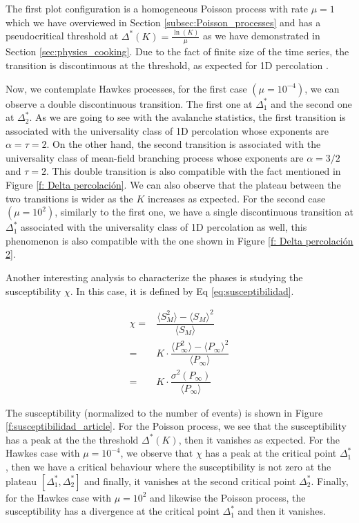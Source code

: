 The first plot configuration is a homogeneous Poisson process with rate $\mu=1$ which we have overviewed in Section \ref{subsec:Poisson_processes} and has a pseudocritical threshold at 
$\Delta^*(K)=\frac{\ln(K)}{\mu}$ as we have demonstrated in Section \ref{sec:physics_cooking}. Due to the fact of finite size of the time series, the transition is discontinuous at 
the threshold, as expected for 1D percolation \cite{stauffer2018introduction}.

Now, we contemplate Hawkes processes, for the first case $\left( \mu=10^{-4} \right)$, we can observe a double discontinuous transition. The first one at $\Delta_1^*$ and the second one at
$\Delta_2^*$. As we are going to see with the avalanche statistics, the first transition is associated with the universality class of 1D percolation whose exponents are $\alpha=\tau=2$. 
On the other hand, the second transition is associated with the universality class of mean-field branching process whose exponents are $\alpha=3/2$ and $\tau=2$. This double transition 
is also compatible with the fact mentioned in Figure \ref{f: Delta percolación}. We can also observe that the plateau between the two transitions is wider as the $K$ increases as expected.
For the second case $\left( \mu=10^2 \right)$, similarly to the first one, we have a single discontinuous transition at $\Delta_1^*$ associated with the universality class of 1D percolation
as well, this phenomenon is also compatible with the one shown in Figure \ref{f: Delta percolación 2}.

Another interesting analysis to characterize the phases is studying the susceptibility $\chi$. In this case, it is defined by Eq \ref{eq:susceptibilidad}.

\begin{equation}
    \begin{split}
        \chi =& \dfrac{ \langle S_M^2 \rangle - \langle S_M \rangle^2 }{\langle S_M \rangle}\\
             =& K\cdot \dfrac{\langle P_{\infty}^2 \rangle - \langle P_{\infty} \rangle^2}{\langle P_{\infty} \rangle}\\
             =& K\cdot \dfrac{\sigma^2\left( P_\infty \right)}{\langle P_{\infty} \rangle}
    \end{split}
    \label{eq:susceptibilidad}
\end{equation}

The susceptibility (normalized to the number of events) is shown in Figure \ref{f:susceptibilidad_article}. For the Poisson process, we see that the susceptibility has a peak at the
the threshold $\Delta^*(K)$, then it vanishes as expected. For the Hawkes case with $\mu=10^{-4}$, we observe that $\chi$ has a peak at the critical point $\Delta_1^*$, then 
we have a critical behaviour where the susceptibility is not zero at the plateau $[\Delta_1^*,\Delta_2^*]$ and finally, it vanishes at the second critical point $\Delta_2^*$. Finally, 
for the Hawkes case with $\mu=10^2$ and likewise the Poisson process, the susceptibility has a divergence at the critical point $\Delta_1^*$ and then it vanishes. 

